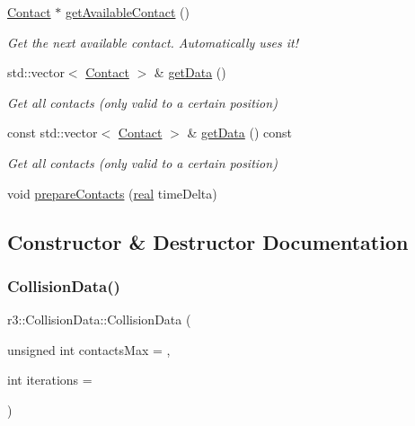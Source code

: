 \begin{DoxyCompactItemize}
\mbox{\hyperlink{classr3_1_1_contact}{Contact}} $\ast$ \mbox{\hyperlink{classr3_1_1_collision_data_ad0e0b85004905b48a8faf7be34bdf305}{get\+Available\+Contact}} ()
\begin{DoxyCompactList}\small\item\em Get the next available contact. Automatically uses it! \end{DoxyCompactList}\item 
std\+::vector$<$ \mbox{\hyperlink{classr3_1_1_contact}{Contact}} $>$ \& \mbox{\hyperlink{classr3_1_1_collision_data_acb1bb23e8d0f37f0ebc39e8f7642419f}{get\+Data}} ()
\begin{DoxyCompactList}\small\item\em Get all contacts (only valid to a certain position) \end{DoxyCompactList}\item 
const std\+::vector$<$ \mbox{\hyperlink{classr3_1_1_contact}{Contact}} $>$ \& \mbox{\hyperlink{classr3_1_1_collision_data_ab31745ebb708c1d04e22bcfb385e663f}{get\+Data}} () const
\begin{DoxyCompactList}\small\item\em Get all contacts (only valid to a certain position) \end{DoxyCompactList}\item 
void \mbox{\hyperlink{classr3_1_1_collision_data_a7a8dcf7d0b2cdd99d9c96dabc2a4fbc9}{prepare\+Contacts}} (\mbox{\hyperlink{namespacer3_ab2016b3e3f743fb735afce242f0dc1eb}{real}} time\+Delta)
\end{DoxyCompactItemize}


\subsection{Constructor \& Destructor Documentation}
\mbox{\label{classr3_1_1_collision_data_a439100db9ec5b734e2f0b778d2f97cce}} 
\subsubsection{\texorpdfstring{Collision\+Data()}{CollisionData()}}
{\footnotesize\ttfamily r3\+::\+Collision\+Data\+::\+Collision\+Data (\begin{DoxyParamCaption}\item[{unsigned int}]{contacts\+Max = {},  }\item[{int}]{iterations = {} }\end{DoxyParamCaption})\hspace{0.3cm}{\ttfamily [explicit]}}

